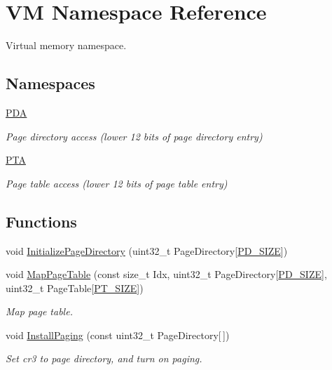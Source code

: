 \hypertarget{namespace_v_m}{}\section{VM Namespace Reference}
\label{namespace_v_m}


Virtual memory namespace.  


\subsection*{Namespaces}
\begin{DoxyCompactItemize}
\item 
 \hyperlink{namespace_v_m_1_1_p_d_a}{P\+DA}
\begin{DoxyCompactList}\small\item\em Page directory access (lower 12 bits of page directory entry) \end{DoxyCompactList}\item 
 \hyperlink{namespace_v_m_1_1_p_t_a}{P\+TA}
\begin{DoxyCompactList}\small\item\em Page table access (lower 12 bits of page table entry) \end{DoxyCompactList}\end{DoxyCompactItemize}
\subsection*{Functions}
\begin{DoxyCompactItemize}
\item 
void \hyperlink{namespace_v_m_a722753d2c3fafcd36dad99fb1fa1eaf3}{Initialize\+Page\+Directory} (uint32\+\_\+t Page\+Directory\mbox{[}\hyperlink{namespace_v_m_a9a281e32930026b0c172914c1991ee6c}{P\+D\+\_\+\+S\+I\+ZE}\mbox{]})
\item 
void \hyperlink{namespace_v_m_a23f571f0afcc986879a5d489ca0a2d4a}{Map\+Page\+Table} (const size\+\_\+t Idx, uint32\+\_\+t Page\+Directory\mbox{[}\hyperlink{namespace_v_m_a9a281e32930026b0c172914c1991ee6c}{P\+D\+\_\+\+S\+I\+ZE}\mbox{]}, uint32\+\_\+t Page\+Table\mbox{[}\hyperlink{namespace_v_m_a64558f9565f1bb4a12eb2ddd7b7c1106}{P\+T\+\_\+\+S\+I\+ZE}\mbox{]})
\begin{DoxyCompactList}\small\item\em Map page table. \end{DoxyCompactList}\item 
void \hyperlink{namespace_v_m_a9c0e1f32f8ec14ae7f246197e5b46498}{Install\+Paging} (const uint32\+\_\+t Page\+Directory\mbox{[}$\,$\mbox{]})
\begin{DoxyCompactList}\small\item\em Set cr3 to page directory, and turn on paging. \end{DoxyCompactList}\end{DoxyCompactItemize}
